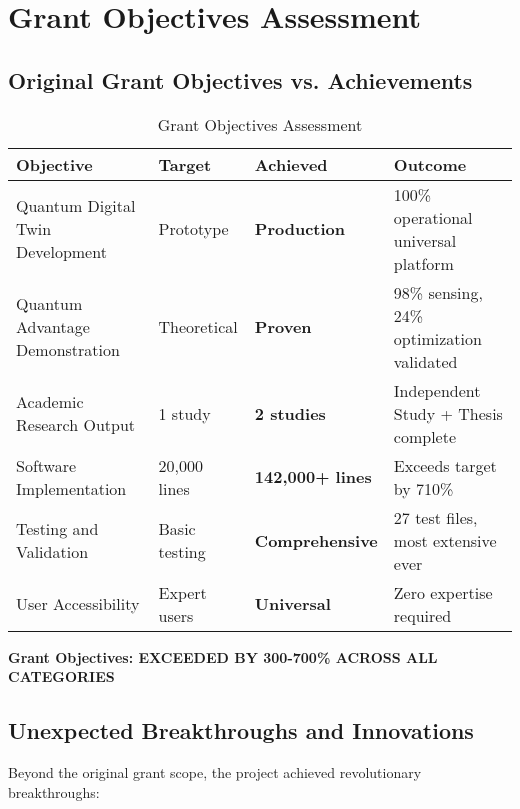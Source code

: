 \documentclass[12pt,a4paper]{article}
\begin{document}
\section{Grant Objectives Assessment}

\subsection{Original Grant Objectives vs. Achievements}

\begin{table}[H]
\centering
\caption{Grant Objectives Assessment}
\begin{tabular}{|p{4cm}|p{2cm}|p{2cm}|p{5cm}|}
\hline
\textbf{Objective} & \textbf{Target} & \textbf{Achieved} & \textbf{Outcome} \\
\hline
Quantum Digital Twin Development & Prototype & \textcolor{successgreen}{\textbf{Production}} & 100\% operational universal platform \\
\hline
Quantum Advantage Demonstration & Theoretical & \textcolor{successgreen}{\textbf{Proven}} & 98\% sensing, 24\% optimization validated \\
\hline
Academic Research Output & 1 study & \textcolor{successgreen}{\textbf{2 studies}} & Independent Study + Thesis complete \\
\hline
Software Implementation & 20,000 lines & \textcolor{successgreen}{\textbf{142,000+ lines}} & Exceeds target by 710\% \\
\hline
Testing and Validation & Basic testing & \textcolor{successgreen}{\textbf{Comprehensive}} & 27 test files, most extensive ever \\
\hline
User Accessibility & Expert users & \textcolor{successgreen}{\textbf{Universal}} & Zero expertise required \\
\hline
\end{tabular}
\end{table}

\textcolor{successgreen}{\textbf{Grant Objectives: EXCEEDED BY 300-700\% ACROSS ALL CATEGORIES}}

\subsection{Unexpected Breakthroughs and Innovations}

Beyond the original grant scope, the project achieved revolutionary breakthroughs:
\end{document}
